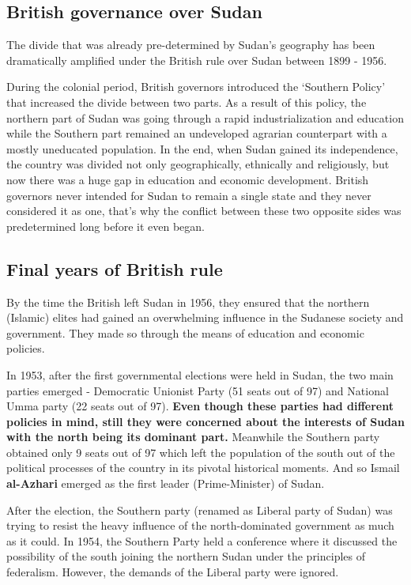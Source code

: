 \documentclass[14pt,a4paper]{article}
\begin{document}
\subsection{British governance over Sudan}
The divide that was already pre-determined by Sudan’s geography has been dramatically amplified under the British rule over Sudan between 1899 - 1956. 

During the colonial period, British governors introduced the ‘Southern Policy’ that increased the divide between two parts. As a result of this policy, the northern part of Sudan was going through a rapid industrialization and education while the Southern part remained an undeveloped agrarian counterpart with a mostly uneducated population. \cite{lin2018role} In the end, when Sudan gained its independence, the country was divided not only geographically, ethnically and religiously, but now there was a huge gap in education and economic development. 
British governors never intended for Sudan to remain a single state and they never considered it as one, that’s why the conflict between these two opposite sides was predetermined long before it even began. 


\subsection{Final years of British rule}
By the time the British left Sudan in 1956, they ensured  that the northern (Islamic) elites had gained an overwhelming influence in the Sudanese society and government. They made so through the means of education and economic policies\cite{lin2018role}.  

In 1953, after the first governmental elections were held in Sudan,  the two main parties emerged - Democratic Unionist Party (51 seats out of 97)  and National Umma party (22 seats out of 97)\cite{sternberger1978wahl}. \textbf{Even though these parties had different policies in mind, still they were concerned about the interests of Sudan with the north being its dominant part.} Meanwhile the Southern party obtained only 9 seats out of 97 which left the population of the south out of the political processes of the country in its pivotal historical moments\cite{sternberger1978wahl}. And so Ismail \textbf{al-Azhari} emerged as the first leader (Prime-Minister) of Sudan. 

After the election, the Southern party (renamed as Liberal party of Sudan) was trying to resist the heavy influence of the north-dominated government as much as it could. In 1954, the Southern Party held a conference where it discussed the possibility of the south joining the northern Sudan under the principles of federalism. However, the demands of the Liberal party were ignored\cite{ruay1994politics}.
\end{document}
